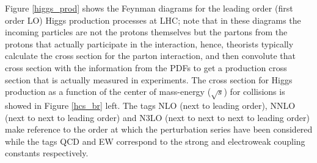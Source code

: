Figure \ref{higgs_prod} shows the Feynman diagrams for the leading order (first order LO) Higgs production processes at LHC; note that in these diagrams the incoming particles are not the protons themselves but the partons from the protons that actually participate in the interaction, hence, theorists typically calculate the cross section for the parton interaction, and then convolute that cross section with the information from the PDFs to get a production cross section that is actually measured in experiments. The cross section for Higgs production as a function of the center of mass-energy ($\sqrt{s}$) for \pp collisions is showed in Figure \ref{hcs_br} left. The tags NLO (next to leading order), NNLO (next to next to leading order) and N3LO (next to next to next to leading order) make reference to the order at which the perturbation series have been considered while the tags QCD and EW correspond to the strong and electroweak coupling constants respectively.

